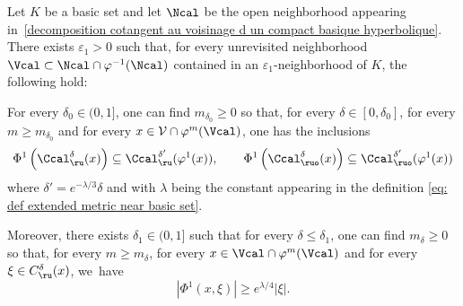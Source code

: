 \begin{lemma}\label{stabilite voisinage conique tilde pour Phi1} Let $K$ be a basic set and let $\Ncal$ be the open neighborhood appearing in~\eqref{decomposition cotangent au voisinage d un compact basique hyperbolique}. There exists $\varepsilon_1 >0$ such that, for every unrevisited neighborhood $\Vcal \subset \Ncal \cap\nobreak\varphi^{-1}(\Ncal)$ contained in an $\varepsilon_1$-neighborhood of $K$, the following hold:
\begin{enumeratei}
\item\label{stabilitei} For every $\delta_0\in(0,1]$, one can find $m_{\delta_0} \geq 0$ so that, for every $\delta\in[0,\delta_0]$, for every $m \geq m_{\delta_0}$ and for every $x\in\mathcal{V}\cap\varphi^{m}(\Vcal)$,
one has the inclusions
\begin{equation}\label{lemma stab vois conique tilde - Unstable inlusions}
\Phi^{1}\left(\Ccal_{\ru}^{\delta}(x)\right) \subseteq \Ccal_{\ru}^{\delta'}(\varphi^{1}(x)), \qquad
\Phi^{1}\left(\Ccal_{\ruo}^{\delta}(x) \right) \subseteq \Ccal_{\ruo}^{\delta'}(\varphi^{1}(x))
\end{equation}
where $\delta' = e^{-\lambda/3} \delta$ and with $\lambda$ being the constant appearing in the definition \eqref{eq: def extended metric near basic set}.
\item\label{stabiliteii} Moreover, there exists $\delta_1\in(0,1]$ such that for every $\delta \leq \delta_1$, one can find $m_{\delta} \geq 0$ so that, for every $m \geq m_\delta$, for every $x \in \Vcal \cap\varphi^{m}(\Vcal)$ and for every $\xi \in C^\delta_\ru(x)$, we~have
\[
|\Phi^1 (x,\xi)| \geq e^{\lambda /4} |\xi|.
\]
\end{enumeratei}
\end{lemma}

